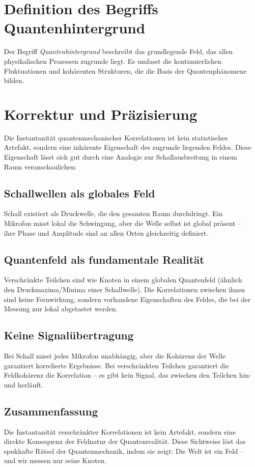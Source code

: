 \documentclass[12pt,a4paper]{article}
\begin{document}
\section{Definition des Begriffs Quantenhintergrund}
Der Begriff \textit{Quantenhintergrund} beschreibt das grundlegende Feld, das allen physikalischen Prozessen zugrunde liegt. Es umfasst die kontinuierlichen Fluktuationen und kohärenten Strukturen, die die Basis der Quantenphänomene bilden.

\section{Korrektur und Präzisierung}
Die \glqq Instantanität\grqq{} quantenmechanischer Korrelationen ist kein statistisches Artefakt, sondern eine inhärente Eigenschaft des zugrunde liegenden Feldes. Diese Eigenschaft lässt sich gut durch eine Analogie zur Schallausbreitung in einem Raum veranschaulichen:

\subsection{Schallwellen als globales Feld}
Schall existiert als Druckwelle, die den gesamten Raum durchdringt. Ein Mikrofon misst lokal die Schwingung, aber die Welle selbst ist global präsent – ihre Phase und Amplitude sind an allen Orten gleichzeitig definiert.

\subsection{Quantenfeld als fundamentale Realität}
Verschränkte Teilchen sind wie Knoten in einem globalen Quantenfeld (ähnlich den Druckmaxima/Minima einer Schallwelle). Die Korrelationen zwischen ihnen sind keine \glqq Fernwirkung\grqq{}, sondern vorhandene Eigenschaften des Feldes, die bei der Messung nur lokal abgetastet werden.

\subsection{Keine Signalübertragung}
Bei Schall misst jedes Mikrofon unabhängig, aber die Kohärenz der Welle garantiert korrelierte Ergebnisse. Bei verschränkten Teilchen garantiert die Feldkohärenz die Korrelation – es gibt kein \glqq Signal\grqq{}, das zwischen den Teilchen hin- und herläuft.

\subsection{Zusammenfassung}
Die Instantanität verschränkter Korrelationen ist kein Artefakt, sondern eine direkte Konsequenz der Feldnatur der Quantenrealität. Diese Sichtweise löst das \glqq spukhafte\grqq{} Rätsel der Quantenmechanik, indem sie zeigt: Die Welt ist ein Feld – und wir messen nur seine Knoten.
\end{document}
